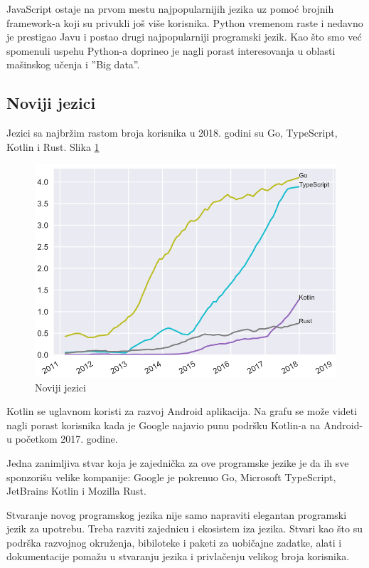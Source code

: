 \documentclass[a4paper]{article}
\begin{document}
JavaScript ostaje na prvom mestu najpopularnijih jezika uz pomoć brojnih framework-a koji su privukli još više korisnika.
Python vremenom raste i nedavno je prestigao Javu i postao drugi najpopularniji programski jezik. Kao što smo već spomenuli uspehu Python-a doprineo je nagli porast interesovanja u oblasti mašinskog učenja i ''Big data''.

\subsection{Noviji jezici}
\label{subsec:noviji jezici}

Jezici sa najbržim rastom broja korisnika u 2018. godini su Go, TypeScript, Kotlin i Rust. Slika \ref{fig:novijiJezici}

\begin{figure}[h!]
\begin{center}
\includegraphics[scale=0.4]{slike/novijiJezici.png}
\end{center}
\caption{Noviji jezici}
\label{fig:novijiJezici}
\end{figure}

Kotlin se uglavnom koristi za razvoj Android aplikacija. Na grafu se može videti nagli porast korisnika kada je Google najavio punu podršku Kotlin-a na Android-u početkom 2017. godine.

Jedna zanimljiva stvar koja je zajednička za ove programske jezike je da ih sve sponzorišu velike kompanije: Google je pokrenuo Go, Microsoft TypeScript, JetBrains Kotlin i Mozilla Rust.

Stvaranje novog programskog jezika nije samo napraviti elegantan programski jezik za upotrebu. Treba razviti zajednicu i ekosistem iza jezika. Stvari kao što su podrška razvojnog okruženja, bibiloteke i paketi za uobičajne zadatke, alati i dokumentacije pomažu u stvaranju jezika i privlačenju velikog broja korisnika.
\end{document}
